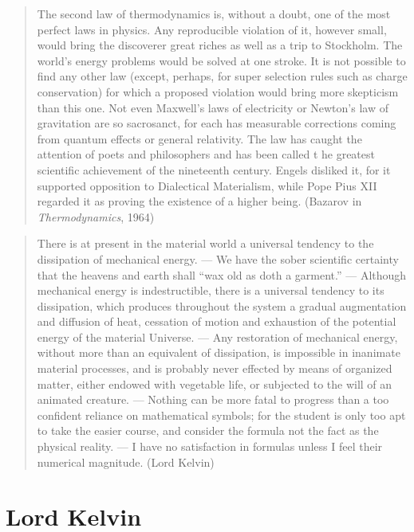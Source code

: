 \small
\begin{quote} The second law of thermodynamics is, without a doubt, one of 
the most perfect laws in physics. Any reproducible violation of it, however 
small, would bring the discoverer great riches as well as a trip to Stockholm. 
The world's energy problems would be solved at one stroke. It is not 
possible to find any other law (except, perhaps, for super selection rules 
such as charge conservation) for which a proposed violation would bring more 
skepticism than this one. Not even Maxwell's laws of electricity or 
Newton's law of gravitation are so sacrosanct, for each has measurable 
corrections coming from quantum effects or general relativity. The law 
has caught the attention of poets and philosophers and has been called t
he greatest scientific achievement of the nineteenth century. Engels 
disliked it, for it supported opposition to Dialectical Materialism, 
while Pope Pius XII regarded it as proving the existence of a higher being.
(Bazarov in \emph{Thermodynamics}, 1964)
\end{quote}
\begin{quote}
There is at present in the material world a universal tendency to the 
dissipation of mechanical energy. --- We have the sober scientific 
certainty that 
the heavens and earth shall ``wax old as doth a garment.'' ---
Although mechanical energy is indestructible, there is a universal tendency 
to its dissipation, which produces throughout the system a gradual 
augmentation and diffusion of heat, cessation of motion and exhaustion 
of the potential energy of the material Universe. ---
Any restoration of mechanical energy, without more than an equivalent 
of dissipation, is impossible in inanimate material processes, and is 
probably never effected by means of organized matter, either endowed 
with vegetable life, or subjected to the will of an animated creature.
 --- Nothing can be more fatal to progress than a too confident reliance 
on mathematical symbols; for the student is only too apt to take the 
easier course, and consider the formula not the fact as the physical 
reality. --- I have no satisfaction in formulas unless I feel their 
numerical magnitude.
(Lord Kelvin)
\end{quote}
\normalsize






\section{Lord Kelvin}

